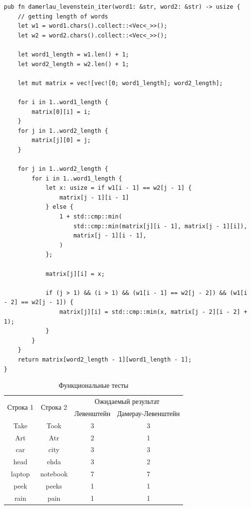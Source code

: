 \documentclass[12pt]{report}
\begin{document}
\newpage

\begin{lstlisting}[label=some-code,caption=Функция нахождения расстояния Дамерау-Левенштейна матрично]
pub fn damerlau_levenstein_iter(word1: &str, word2: &str) -> usize {
    // getting length of words
    let w1 = word1.chars().collect::<Vec<_>>();
    let w2 = word2.chars().collect::<Vec<_>>();

    let word1_length = w1.len() + 1;
    let word2_length = w2.len() + 1;

    let mut matrix = vec![vec![0; word1_length]; word2_length];

    for i in 1..word1_length {
        matrix[0][i] = i;
    }
    for j in 1..word2_length {
        matrix[j][0] = j;
    }

    for j in 1..word2_length {
        for i in 1..word1_length {
            let x: usize = if w1[i - 1] == w2[j - 1] {
                matrix[j - 1][i - 1]
            } else {
                1 + std::cmp::min(
                    std::cmp::min(matrix[j][i - 1], matrix[j - 1][i]),
                    matrix[j - 1][i - 1],
                )
            };

            matrix[j][i] = x;

            if (j > 1) && (i > 1) && (w1[i - 1] == w2[j - 2]) && (w1[i - 2] == w2[j - 1]) {
                matrix[j][i] = std::cmp::min(x, matrix[j - 2][i - 2] + 1);
            }
        }
    }
    return matrix[word2_length - 1][word1_length - 1];
}
\end{lstlisting}


\begin{table}[h]
	\begin{tabular}{|c|c|c|c|}
	\hline
	\multirow{2}{*}{Строка 1} & \multirow{2}{*}{Строка 2} & \multicolumn{2}{c|}{Ожидаемый результат} \\ \cline{3-4} 
		   &          & Левенштейн & Дамерау-Левенштейн \\ \hline
	Take   & Took     & 3          & 3                   \\ \hline
	Art    & Atr      & 2          & 1                   \\ \hline
	car    & city     & 3          & 3                   \\ \hline
	head   & ehda     & 3          & 2                   \\ \hline
	laptop & notebook & 7          & 7                   \\ \hline
	peek   & peeks    & 1          & 1                   \\ \hline
	rain   & pain     & 1          & 1                   \\ \hline
	\end{tabular}
	\caption{Функциональные тесты}
	\label{tab:func_tests}
\end{table}
\end{document}
